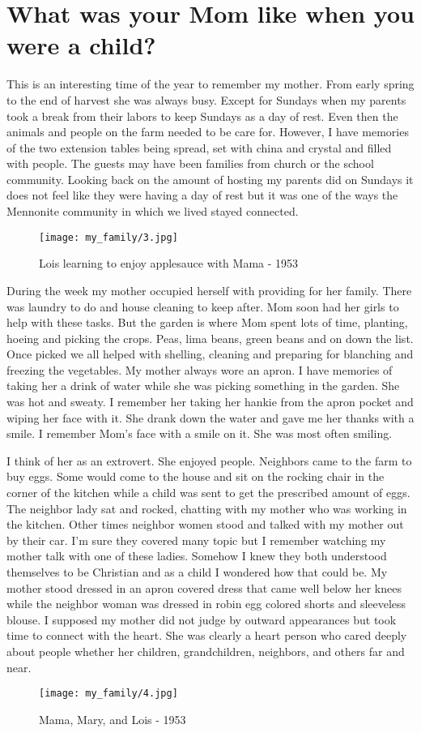 \section{What was your Mom like when you were a child?}

This is an interesting time of the year to remember my mother.
From early spring to the end of harvest she was always busy.
Except for Sundays when my parents took a break from their labors to keep Sundays as a day of rest.
Even then the animals and people on the farm needed to be care for.
However, I have memories of the two extension tables being spread, set with china and crystal and filled with people.
The guests may have been families from church or the school community.
Looking back on the amount of hosting my parents did on Sundays it does not feel like they were having a day of rest but it was one of the ways the Mennonite community in which we lived stayed connected.

\begin{wrapfigure}{R}{0.6\textwidth}
\centering
\texttt{[image: my\_family/3.jpg]}
\caption{Lois learning to enjoy applesauce with Mama - 1953}
\end{wrapfigure}
During the week my mother occupied herself with providing for her family.
There was laundry to do and house cleaning to keep after.
Mom soon had her girls to help with these tasks.
But the garden is where Mom spent lots of time, planting, hoeing and picking the crops.
Peas, lima beans, green beans and on down the list.
Once picked we all helped with shelling, cleaning and preparing for blanching and freezing the vegetables.
My mother always wore an apron.
I have memories of taking her a drink of water while she was picking something in the garden.
She was hot and sweaty.
I remember her taking her hankie from the apron pocket and wiping her face with it.
She drank down the water and gave me her thanks with a smile.
I remember Mom's face with a smile on it.
She was most often smiling.


I think of her as an extrovert.
She enjoyed people.
Neighbors came to the farm to buy eggs.
Some would come to the house and sit on the rocking chair in the corner of the kitchen while a child was sent to get the prescribed amount of eggs.
The neighbor lady sat and rocked, chatting with my mother who was working in the kitchen.
Other times neighbor women stood and talked with my mother out by their car.
I'm sure they covered many topic but I remember watching my mother talk with one of these ladies.
Somehow I knew they both understood themselves to be Christian and as a child I wondered how that could be.
My mother stood dressed in an apron covered dress that came well below her knees while the neighbor woman was dressed in robin egg colored shorts and sleeveless blouse.
I supposed my mother did not judge by outward appearances but took time to connect with the heart.
She was clearly a heart person who cared deeply about people whether her children, grandchildren, neighbors, and others far and near.
\begin{figure}
\centering
\texttt{[image: my\_family/4.jpg]}
\caption{Mama, Mary, and Lois - 1953}
\end{figure}


